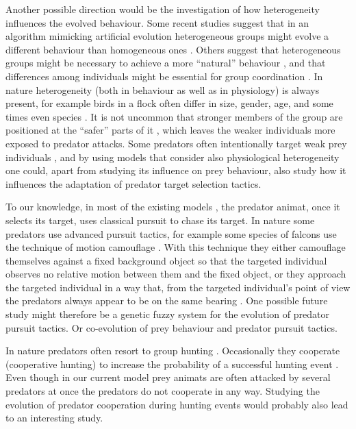 Another possible direction would be the investigation of how heterogeneity influences the evolved behaviour. Some recent studies suggest that in an algorithm mimicking artificial evolution heterogeneous groups might evolve a different behaviour than homogeneous ones \cite{olson2015exploring}. Others suggest that heterogeneous groups might be necessary to achieve a more ``natural'' behaviour \cite{demsar2013family}, and that differences among individuals might be essential for group coordination \cite{marras2012information,marras2013schooling}. In nature heterogeneity (both in behaviour as well as in physiology) is always present, for example birds in a flock often differ in size, gender, age, and some times even species \cite{lebarbajec2009organized,jolles2013heterogeneous}. It is not uncommon that stronger members of the group are positioned at the ``safer'' parts of it \cite{hamilton1971geometry}, which leaves the weaker individuals more exposed to predator attacks. Some predators often intentionally target weak prey individuals \cite{domenici2014howsailfish,marras2015notsofast}, and by using models that consider also physiological heterogeneity one could, apart from studying its influence on prey behaviour, also study how it influences the adaptation of predator target selection tactics.

To our knowledge, in most of the existing models \cite{demsar2014simulated,demsar2015simulating,demsar2016balanced,demsar2017evolution,nishimura2002predator,zheng2005behavior}, the predator animat, once it selects its target, uses classical pursuit \cite{nahin2012chases} to chase its target. In nature some predators use advanced pursuit tactics, for example some species of falcons use the technique of motion camouflage \cite{kane2014falcons}. With this technique they either camouflage themselves against a fixed background object so that the targeted individual observes no relative motion between them and the fixed object, or they approach the targeted individual in a way that, from the targeted individual's point of view the predators always appear to be on the same bearing \cite{justh2006steering}. One possible future study might therefore be a genetic fuzzy system for the evolution of predator pursuit tactics. Or co-evolution of prey behaviour and predator pursuit tactics.

In nature predators often resort to group hunting \cite{creel1995communal,escobedo2014groupsize,fanshawe1993factors,lett2004continuous,muro2011wolfpack,packer1988evolution,scheel1991group}. Occasionally they cooperate (\ie cooperative hunting) to increase the probability of a successful hunting event \cite{creel1995communal,packer1988evolution}. Even though in our current model prey animats are often attacked by several predators at once the predators do not cooperate in any way. Studying the evolution of predator cooperation during hunting events would probably also lead to an interesting study.

